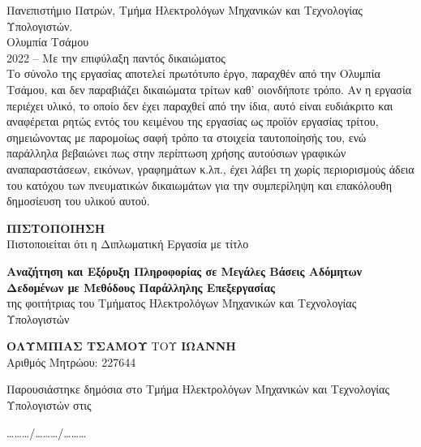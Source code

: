 \begin{titlepage}
\begin{minipage}{\textwidth}
    \small
        Πανεπιστήμιο Πατρών, Τμήμα Ηλεκτρολόγων Μηχανικών και Τεχνολογίας Υπολογιστών.\\[10pt]
        Ολυμπία Τσάμου\\[10pt]
        \en{\copyright } 2022 – Με την επιφύλαξη παντός δικαιώματος\\[10pt]
        Το σύνολο της εργασίας αποτελεί πρωτότυπο έργο, παραχθέν από την  Ολυμπία Τσάμου, και δεν παραβιάζει δικαιώματα τρίτων καθ’ οιονδήποτε τρόπο. Αν η εργασία περιέχει υλικό, το οποίο δεν έχει παραχθεί από την ίδια, αυτό είναι ευδιάκριτο και αναφέρεται ρητώς εντός του κειμένου της εργασίας ως προϊόν εργασίας τρίτου, σημειώνοντας με παρομοίως σαφή τρόπο τα στοιχεία ταυτοποίησής του, ενώ παράλληλα βεβαιώνει πως στην περίπτωση χρήσης αυτούσιων γραφικών αναπαραστάσεων, εικόνων, γραφημάτων κ.λπ., έχει λάβει τη χωρίς περιορισμούς άδεια του κατόχου των πνευματικών δικαιωμάτων για την συμπερίληψη και επακόλουθη δημοσίευση του υλικού αυτού.
    \end{minipage}

\cleardoublepage
\begin{center}
\thispagestyle{empty}
        \Large
    \textbf{ΠΙΣΤΟΠΟΙΗΣΗ}\\         
    
    \vfill
    \large
    Πιστοποιείται ότι η Διπλωματική Εργασία με τίτλο\\
        \vfill
        
    \Large  
    \textbf{Αναζήτηση και Εξόρυξη Πληροφορίας σε Μεγάλες Βάσεις Αδόμητων Δεδομένων με Μεθόδους Παράλληλης Επεξεργασίας}\\
        \vfill
        \large
            της φοιτήτριας του Τμήματος Ηλεκτρολόγων Μηχανικών και Τεχνολογίας Υπολογιστών\\
        \vfill
            
            \large{\textbf{ΟΛΥΜΠΙΑΣ ΤΣΑΜΟΥ} ΤΟΥ \textbf{ΙΩΑΝΝΗ}}\\[7pt]
            Αριθμός Μητρώου: 227644\\
        \vfill
            
            Παρουσιάστηκε δημόσια στο Τμήμα Ηλεκτρολόγων Μηχανικών και Τεχνολογίας Υπολογιστών στις\\
        \vfill

            ………/………/………\\
        \vfill


\end{center}
\end{titlepage}

